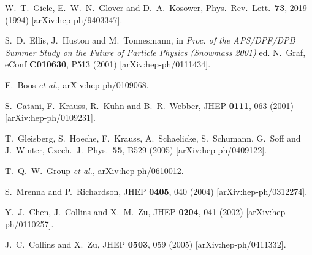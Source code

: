 \documentclass[12pt]{iopart}
\begin{document}
\begin{thebibliography}{99}
  W.~T.~Giele, E.~W.~N.~Glover and D.~A.~Kosower,
  Phys.\ Rev.\ Lett.\  {\bf 73}, 2019 (1994)
  [arXiv:hep-ph/9403347].

  S.~D.~Ellis, J.~Huston and M.~Tonnesmann,
in {\it Proc. of the APS/DPF/DPB Summer Study on the Future of Particle Physics (Snowmass 2001) } ed. N.~Graf,
  eConf {\bf C010630}, P513 (2001)
  [arXiv:hep-ph/0111434].

  E.~Boos {\it et al.},
  arXiv:hep-ph/0109068.

  S.~Catani, F.~Krauss, R.~Kuhn and B.~R.~Webber,
  JHEP {\bf 0111}, 063 (2001)
  [arXiv:hep-ph/0109231].

  T.~Gleisberg, S.~Hoeche, F.~Krauss, A.~Schaelicke, S.~Schumann, G.~Soff and J.~Winter,
  Czech.\ J.\ Phys.\  {\bf 55}, B529 (2005)
  [arXiv:hep-ph/0409122].

  T.~Q.~W.~Group {\it et al.},
  arXiv:hep-ph/0610012.
  
  S.~Mrenna and P.~Richardson,
  JHEP {\bf 0405}, 040 (2004)
  [arXiv:hep-ph/0312274].

  Y.~J.~Chen, J.~Collins and X.~M.~Zu,
  JHEP {\bf 0204}, 041 (2002)
  [arXiv:hep-ph/0110257].

  J.~C.~Collins and X.~Zu,
  JHEP {\bf 0503}, 059 (2005)
  [arXiv:hep-ph/0411332].


\end{thebibliography}
\end{document}
